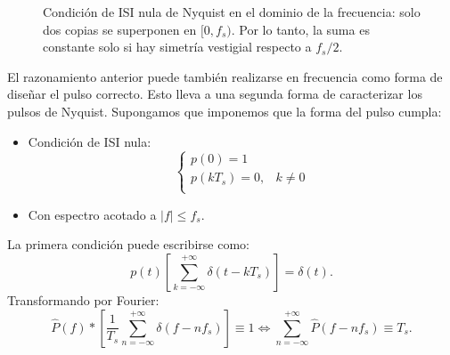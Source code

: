 \begin{figure}
    \begin{center}
    \end{center}
    \caption{Condición de ISI nula de Nyquist en el dominio de la frecuencia: solo dos copias se superponen en $[0,f_s)$. Por lo tanto, la suma es constante solo si hay simetría vestigial respecto a $f_s/2$.}\label{fig:simetria vestigial}
\end{figure}

El razonamiento anterior puede también realizarse en frecuencia como forma de diseñar el pulso correcto. Esto lleva a una segunda forma de caracterizar los pulsos de Nyquist. Supongamos que imponemos que la forma del pulso cumpla:
\begin{itemize}
    \item Condición de ISI nula:
    \begin{equation*}
        \begin{cases}
            p(0) = 1 \\
            p(kT_s) = 0,& k\neq 0\\
        \end{cases}
    \end{equation*}
    \item Con espectro acotado a $|f|\leqslant f_s$.
\end{itemize}

La primera condición puede escribirse como:
\begin{equation*}
    p(t) \left[\sum_{k=-\infty}^{+\infty} \delta(t-kT_s)\right] = \delta(t).
\end{equation*}
Transformando por Fourier:
\begin{equation}\label{eq:nyquist frecuencia}
 \hat{P}(f)\ast \left[\frac{1}{T_s} \sum_{n=-\infty}^{+\infty} \delta(f-n f_s)\right]\equiv  1
  \Leftrightarrow  \sum_{n=-\infty}^{+\infty} \hat{P}(f-n f_s) \equiv T_s.
\end{equation}

